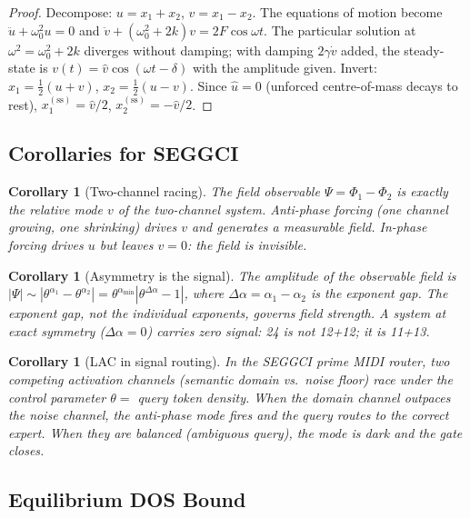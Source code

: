 \documentclass[12pt,a4paper]{article}
\theoremstyle{plain}
\newtheorem{corollary}[theorem]{Corollary}
\theoremstyle{definition}
\theoremstyle{remark}
\begin{document}
\begin{proof}
Decompose: $u = x_1+x_2$, $v = x_1-x_2$.  The equations of motion
become $\ddot u + \omega_0^2 u = 0$ and
$\ddot v + (\omega_0^2+2k)v = 2F\cos\omega t$.
The particular solution at $\omega^2 = \omega_0^2+2k$ diverges without
damping; with damping $2\gamma\dot v$ added, the steady-state is
$v(t)=\hat v\cos(\omega t - \delta)$ with the amplitude given.
Invert: $x_1=\frac{1}{2}(u+v)$, $x_2=\frac{1}{2}(u-v)$.
Since $\hat u = 0$ (unforced centre-of-mass decays to rest),
$x_1^{(\text{ss})} = \hat v/2$, $x_2^{(\text{ss})} = -\hat v/2$.
\end{proof}

\subsection{Corollaries for SEGGCI}

\begin{corollary}[Two-channel racing]
\label{cor:racing}
The field observable $\Psi = \Phi_1 - \Phi_2$ is exactly the relative
mode $v$ of the two-channel system.  Anti-phase forcing (one channel
growing, one shrinking) drives $v$ and generates a measurable field.
In-phase forcing drives $u$ but leaves $v = 0$: the field is invisible.
\end{corollary}

\begin{corollary}[Asymmetry is the signal]
The amplitude of the observable field is
$|\Psi| \sim |\theta^{\alpha_1} - \theta^{\alpha_2}|
= \theta^{\alpha_{\min}} |\theta^{\Delta\alpha} - 1|$,
where $\Delta\alpha = \alpha_1 - \alpha_2$ is the \emph{exponent gap}.
The exponent gap, not the individual exponents, governs field strength.
A system at exact symmetry ($\Delta\alpha = 0$) carries zero signal:
24 is not 12+12; it is 11+13.
\end{corollary}

\begin{corollary}[LAC in signal routing]
In the SEGGCI prime MIDI router, two competing activation channels
(semantic domain vs.\ noise floor) race under the control parameter
$\theta = $ query token density.  When the domain channel outpaces the
noise channel, the anti-phase mode fires and the query routes to the
correct expert.  When they are balanced (ambiguous query), the mode is
dark and the gate closes.
\end{corollary}

\subsection{Equilibrium DOS Bound}
\end{document}
